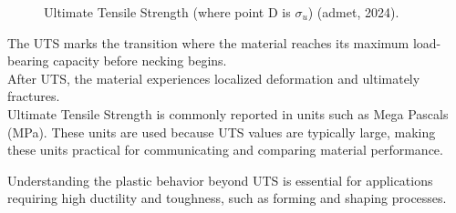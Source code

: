 \documentclass{article}
\begin{document}
{\begin{center}
\begin{minipage}{0.42\textwidth}
\begin{figure}[H]
            \caption{Ultimate Tensile Strength (where point D is $\sigma_{u}$) (admet, 2024).}
            \label{fig:uts}
        \end{figure}
    \end{minipage}\hfil
    \begin{minipage}{0.45\textwidth}
        The UTS marks the transition where the material reaches its maximum load-bearing capacity before necking begins.\\[8pt] 
        After UTS, the material experiences localized deformation and ultimately fractures.\\[8pt]
        Ultimate Tensile Strength is commonly reported in units such as  Mega Pascals (MPa). These units are used because UTS values are typically large, making these units practical for communicating and comparing material performance.    
    \end{minipage}
\end{center}
Understanding the plastic behavior beyond UTS is essential for applications requiring high ductility and toughness, such as forming and shaping processes.


\newpage

}
\end{document}
